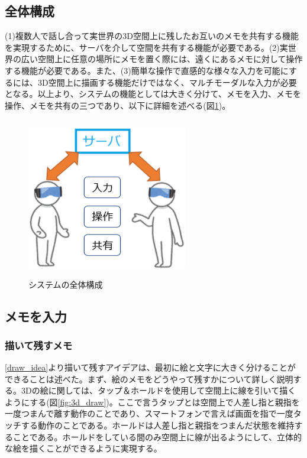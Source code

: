 \documentclass[11pt,a4j, titlepage]{jarticle} %
\begin{document}
\subsection{全体構成}
(1)複数人で話し合って実世界の3D空間上に残したお互いのメモを共有する機能を実現するために、サーバを介して空間を共有する機能が必要である。(2)実世界の広い空間上に任意の場所にメモを置く際には、遠くにあるメモに対して操作する機能が必要である。また、(3)簡単な操作で直感的な様々な入力を可能にするには、3D空間上に描画する機能だけではなく、マルチモーダルな入力が必要となる。以上より、システムの機能としては大きく分けて、メモを入力、メモを操作、メモを共有の三つであり、以下に詳細を述べる(図\ref{fig:systemzentai})。

\begin{figure}[H]
  \begin{center}
    \includegraphics[clip,height=7.0cm,width=7.0cm]{./systemzentai.eps}
    \caption{システムの全体構成}
    \label{fig:systemzentai}
  \end{center}
\end{figure}

\subsection{メモを入力}

\subsubsection{描いて残すメモ} \label{draw_memo}
\ref{draw_idea}より描いて残すアイデアは、最初に絵と文字に大きく分けることができることは述べた。まず、絵のメモをどうやって残すかについて詳しく説明する。3Dの絵に関しては、タップ＆ホールドを使用して空間上に線を引いて描くようにする(図\ref{fig:3d_draw})。ここで言うタップとは空間上で人差し指と親指を一度つまんで離す動作のことであり、スマートフォンで言えば画面を指で一度タッチする動作のことである。ホールドは人差し指と親指をつまんだ状態を維持することである。ホールドをしている間のみ空間上に線が出るようにして、立体的な絵を描くことができるように実現する。
\end{document}
